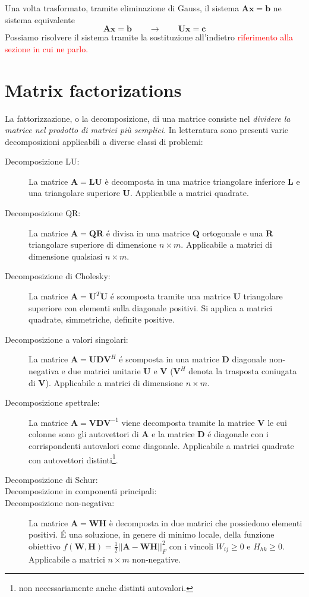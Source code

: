 \documentclass[10pt]{article}
\begin{document}
Una volta trasformato, tramite eliminazione di Gauss, il sistema $\mathbf{Ax}=\mathbf{b}$ ne sistema equivalente
$$ \mathbf{A} \mathbf{x} = \mathbf{b}
\qquad \rightarrow \qquad
\mathbf{U} \mathbf{x} = \mathbf{c}
$$
Possiamo risolvere il sistema tramite la sostituzione all'indietro \textcolor{red}{riferimento alla sezione in cui ne parlo.}




\section{Matrix factorizations}

La fattorizzazione, o la decomposizione, di una matrice consiste nel \emph{dividere la matrice nel prodotto di matrici più semplici}.
In letteratura sono presenti varie decomposizioni applicabili a diverse classi di problemi:
\begin{description}
\item[Decomposizione LU:] La matrice $\mathbf{A}=\mathbf{L}\mathbf{U}$ è decomposta in una matrice triangolare inferiore $\mathbf{L}$ e una triangolare superiore $\mathbf{U}$. Applicabile a matrici quadrate.
\item[Decomposizione QR:] La matrice $\mathbf{A}=\mathbf{Q}\mathbf{R}$ é divisa in una matrice $\mathbf{Q}$ ortogonale e una $\mathbf{R}$ triangolare superiore di dimensione $n\times m$. Applicabile a matrici di dimensione qualsiasi $n\times m$.
\item[Decomposizione di Cholesky:] La matrice $\mathbf{A}=\mathbf{U}^T\mathbf{U}$ é scomposta tramite una matrice $\mathbf{U}$ triangolare superiore con elementi sulla diagonale positivi. Si applica a matrici quadrate, simmetriche, definite positive.
\item[Decomposizione a valori singolari:] La matrice $\mathbf{A}=\mathbf{U}\mathbf{D}\mathbf{V}^H$ é scomposta in una matrice $\mathbf{D}$ diagonale non-negativa e due matrici unitarie $\mathbf{U}$ e $\mathbf{V}$ ($\mathbf{V}^H$ denota la trasposta coniugata di $\mathbf{V}$). Applicabile a matrici di dimensione $n\times m$.
\item[Decomposizione spettrale:] La matrice $\mathbf{A}=\mathbf{V}\mathbf{D}\mathbf{V}^{-1}$ viene decomposta tramite la matrice $\mathbf{V}$ le cui colonne sono gli autovettori di $\mathbf{A}$ e la matrice $\mathbf{D}$ é diagonale con i corrispondenti autovalori come diagonale. Applicabile a matrici quadrate con autovettori distinti\footnote{non necessariamente anche distinti autovalori.}.
\item[Decomposizione di Schur:]
\item[Decomposizione in componenti principali:]
\item[Decomposizione non-negativa:] La matrice $\mathbf{A}=\mathbf{W}\mathbf{H}$ è decomposta in due matrici che possiedono elementi positivi. É una soluzione, in genere di minimo locale, della funzione obiettivo $f(\mathbf{W},\mathbf{H})=\frac{1}{2}||\mathbf{A}-\mathbf{W}\mathbf{H}||^2_F$ con i vincoli $W_{ij} \geq 0$ e $H_{hk}\geq 0$. Applicabile a matrici $n\times m$ non-negative.
\end{description}
\end{document}
